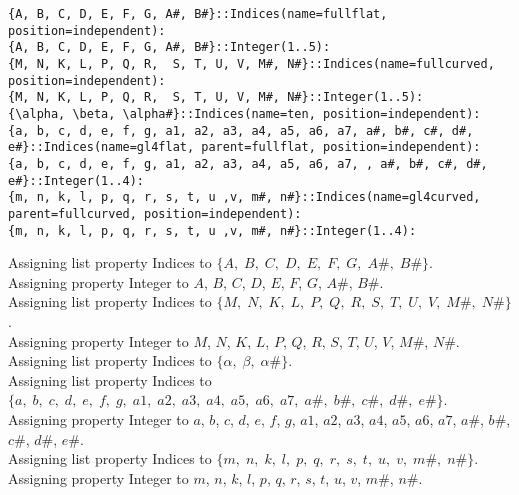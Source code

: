 \documentclass[11pt]{article}
\begin{document}
{\color[named]{Blue}\begin{verbatim}
{A, B, C, D, E, F, G, A#, B#}::Indices(name=fullflat, position=independent):
{A, B, C, D, E, F, G, A#, B#}::Integer(1..5):
{M, N, K, L, P, Q, R,  S, T, U, V, M#, N#}::Indices(name=fullcurved, position=independent):
{M, N, K, L, P, Q, R,  S, T, U, V, M#, N#}::Integer(1..5):
{\alpha, \beta, \alpha#}::Indices(name=ten, position=independent):
{a, b, c, d, e, f, g, a1, a2, a3, a4, a5, a6, a7, a#, b#, c#, d#, e#}::Indices(name=gl4flat, parent=fullflat, position=independent):
{a, b, c, d, e, f, g, a1, a2, a3, a4, a5, a6, a7, , a#, b#, c#, d#, e#}::Integer(1..4):
{m, n, k, l, p, q, r, s, t, u ,v, m#, n#}::Indices(name=gl4curved, parent=fullcurved, position=independent):
{m, n, k, l, p, q, r, s, t, u ,v, m#, n#}::Integer(1..4):
\end{verbatim}}
Assigning list property Indices to $\{A,\; B,\; C,\; D,\; E,\; F,\; G,\; A\#,\; B\#\}$.
\\
Assigning property Integer to $A$, $B$, $C$, $D$, $E$, $F$, $G$, $A\#$, $B\#$.
\\
Assigning list property Indices to $\{M,\; N,\; K,\; L,\; P,\; Q,\; R,\; S,\; T,\; U,\; V,\; M\#,\; N\#\}$.
\\
Assigning property Integer to $M$, $N$, $K$, $L$, $P$, $Q$, $R$, $S$, $T$, $U$, $V$, $M\#$, $N\#$.
\\
Assigning list property Indices to $\{\alpha,\; \beta,\; \alpha\#\}$.
\\
Assigning list property Indices to $\{a,\; b,\; c,\; d,\; e,\; f,\; g,\; a1,\; a2,\; a3,\; a4,\; a5,\; a6,\; a7,\; a\#,\; b\#,\; c\#,\; d\#,\; e\#\}$.
\\
Assigning property Integer to $a$, $b$, $c$, $d$, $e$, $f$, $g$, $a1$, $a2$, $a3$, $a4$, $a5$, $a6$, $a7$, $a\#$, $b\#$, $c\#$, $d\#$, $e\#$.
\\
Assigning list property Indices to $\{m,\; n,\; k,\; l,\; p,\; q,\; r,\; s,\; t,\; u,\; v,\; m\#,\; n\#\}$.
\\
Assigning property Integer to $m$, $n$, $k$, $l$, $p$, $q$, $r$, $s$, $t$, $u$, $v$, $m\#$, $n\#$.
\\
\end{document}
